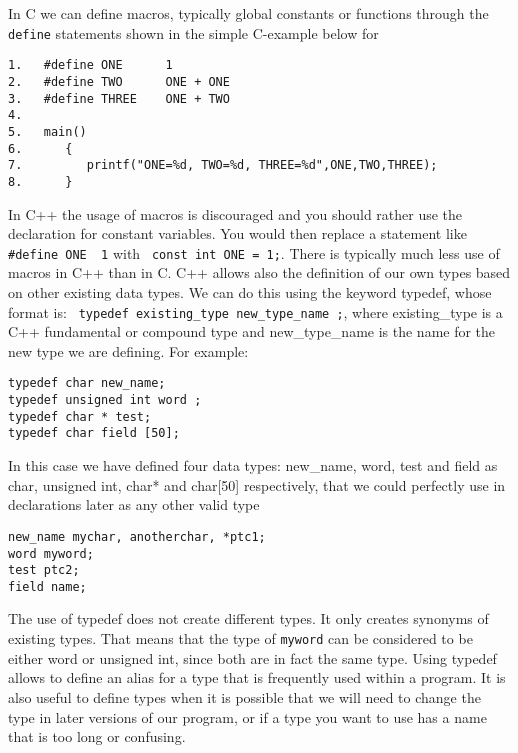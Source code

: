 In C we can define macros, typically global constants or functions through
the \verb?define? statements shown in the simple C-example below for  
\begin{lstlisting}
1.   #define ONE      1
2.   #define TWO      ONE + ONE
3.   #define THREE    ONE + TWO
4.
5.   main()
6.      {
7.         printf("ONE=%d, TWO=%d, THREE=%d",ONE,TWO,THREE);
8.      } 
\end{lstlisting}
In C++ the usage of macros is discouraged and you should rather use 
the declaration for constant variables. You would then replace a statement like
\verb? #define ONE  1? with \verb? const int ONE = 1;?. There is typically much less use of
macros in C++ than in C. 
C++ allows also the definition of our own types based on other existing data types. 
We can do this using the keyword typedef, whose format is:
\verb? typedef existing_type new_type_name ;?,
where existing\_type is a C++ fundamental or compound type and new\_type\_name is the name for the new type we are defining. For example:
\begin{lstlisting}
typedef char new_name;
typedef unsigned int word ;
typedef char * test;
typedef char field [50]; 
\end{lstlisting}
In this case we have defined four data types: new\_name, word, test and field as char, 
unsigned int, char* and char[50] respectively, that we could perfectly use in declarations later as any other valid type
\begin{lstlisting}
new_name mychar, anotherchar, *ptc1;
word myword;
test ptc2;
field name; 
\end{lstlisting}
The use of typedef does not create different types. 
It only creates synonyms of existing types. 
That means that the type of \verb?myword? can be considered to be either word or unsigned int, 
since both are in fact the same type.
Using
typedef allows to define an alias for a type that is frequently used within a program. 
It is also useful to define types when it is possible that we will need to 
change the type in later versions of our program, 
or if a type you want to use has a name that is too long or confusing.

